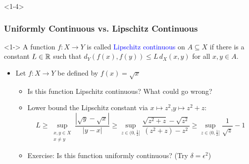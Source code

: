 \documentclass[10pt,english,aspectratio=169]{beamer}
\begin{document}
\begin{frame}<1-4>
\frametitle{Uniformly Continuous vs. Lipschitz Continuous}

\begin{definition}<1->
A function $f  \colon X \rightarrow Y$ is called \textcolor{blue}{Lipschitz continuous} on $A \subseteq X$ if there is a constant $L \in \mathbb{R}$ such that $d_Y (f(x),f(y)) \leq L \, d_X (x,y)$ for all $x,y\in A$.
\end{definition}
\vspace{2mm}

\vspace{1.5mm}

\begin{itemize}
\setlength\itemsep{3mm}
\item<2-> Let $f:X \to Y$ be defined by $f(x) = \sqrt{x}$ \vspace{1mm}

\begin{itemize} 
  \setlength\itemsep{1.5mm}
  \item<2-> Is this function Lipschitz continuous?  What could go wrong?
  \item<3-> Lower bound the Lipschitz constant via $x\mapsto z^2$,$y\mapsto z^2+z$: \vspace{-0.5mm}
  \[ \!\!\!\!\!\!\!\!\!\!\!\!\!\! L \geq \sup_{\substack{x,y\in X \\ x\neq y}} \frac{|\sqrt{y} - \sqrt{x}|}{|y-x|} \geq \sup_{z\in (0,\frac{1}{2}]} \frac{\sqrt{z^2 + z}-\sqrt{z^2}}{(z^2+z)-z^2} \geq \sup_{z\in (0,\frac{1}{2}]}  \frac{1}{\sqrt{z}} - 1 \]
  \vspace{2mm}
  
  \item<4-> Exercise: Is this function uniformly continuous? (Try $\delta=\epsilon^2$)
  
  \end{itemize}
\end{itemize}



\end{frame}
\end{document}
